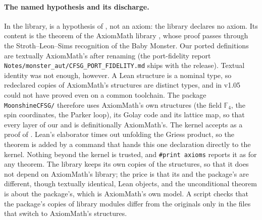 \documentclass[10pt]{article}
\begin{document}
\paragraph{The named hypothesis and its discharge.} In the library,  is a hypothesis of
, not an axiom: the library declares no axiom. Its content is the theorem
 of the AxiomMath library \cite{AxiomCFSG}, whose proof
passes through the Stroth--Leon--Sims recognition of the Baby Monster. Our ported definitions
are textually AxiomMath's after renaming (the port-fidelity report \texttt{Notes/monster\_aut/CFSG\_PORT\_FIDELITY.md}
ships with the release). Textual identity was not enough, however. A Lean structure is a nominal type, so redeclared
copies of AxiomMath's structures are distinct types, and in v1.05  could not have proved
 even on a common toolchain. The package \texttt{MoonshineCFSG/} therefore uses AxiomMath's own structures (the
field $\mathbb F_4$, the spin coordinates, the Parker loop), its Golay code and its lattice map, so that every layer of our
 and  is definitionally AxiomMath's. The kernel accepts
 as a proof of . Lean's elaborator times out unfolding the Griess product, so
the theorem  is added by a command that hands this one declaration directly to the kernel. Nothing
beyond the kernel is trusted, and \texttt{\#print axioms} reports it as for any theorem. The library keeps its own
copies of the structures, so that it does not depend on AxiomMath's library; the price is that its  and the
package's are different, though textually identical, Lean objects, and the unconditional theorem is about the
package's, which is AxiomMath's own model. A script checks that the package's copies of library modules differ from
the originals only in the files that switch to AxiomMath's structures.
\end{document}
